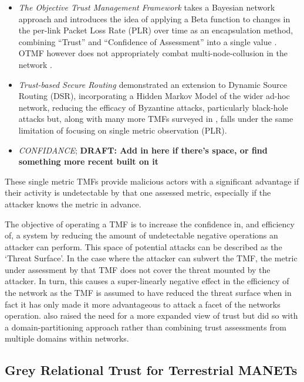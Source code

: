 \documentclass[runningheads,a4paper]{llncs}
\begin{document}
\begin{itemize}
  \item \emph{The Objective Trust Management Framework} takes a Bayesian network approach and introduces the idea of applying a Beta function to changes in the per-link Packet Loss Rate (PLR) over time as an encapsulation method, combining ``Trust'' and ``Confidence of Assessment'' into a single value \cite{Li2008}. 
OTMF however does not appropriately combat multi-node-collusion in the network \cite{Cho2011}. 

  \item \emph{Trust-based Secure Routing \cite{Moe2008a}} demonstrated an extension to Dynamic Source Routing (DSR), incorporating a Hidden Markov Model of the wider ad-hoc network, reducing the efficacy of Byzantine attacks, particularly black-hole attacks but, along with many more TMFs surveyed in \cite{Cho2011}, falls under the same limitation of focusing on single metric observation (PLR). 
  \item \emph{CONFIDANCE}; \textbf{DRAFT: Add \cite{Buchegger2002} in here if there's space, or find something more recent built on it}
\end{itemize}

These single metric TMFs provide malicious actors with a significant advantage if their activity is undetectable by that one assessed metric, especially if the attacker knows the metric in advance. 

The objective of operating a TMF is to increase the confidence in, and efficiency of, a system by reducing the amount of undetectable negative operations an attacker can perform. 
This space of potential attacks can be described as the ‘Threat Surface’. 
In the case where the attacker can subvert the TMF, the metric under assessment by that TMF does not cover the threat mounted by the attacker. 
In turn, this causes a super-linearly negative effect in the efficiency of the network as the TMF is assumed to have reduced the threat surface when in fact it has only made it more advantageous to attack a facet of the networks operation.  
\cite{Huang2010a} also raised the need for a more expanded view of trust but did so with a domain-partitioning approach rather than combining trust assessments from multiple domains within networks. 

\subsection{Grey Relational Trust for Terrestrial MANETs}
\end{document}
